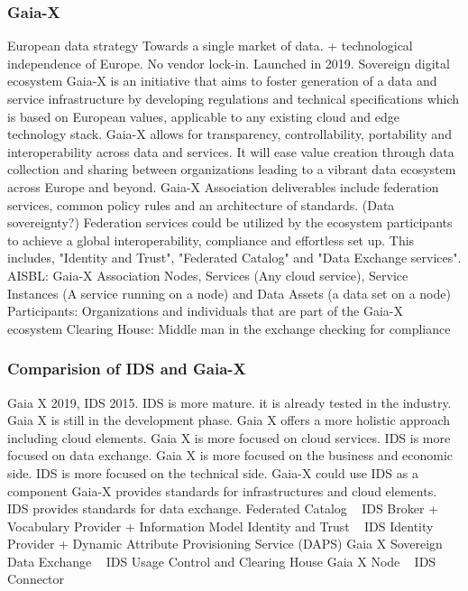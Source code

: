 \documentclass{article}
\begin{document}
\subsubsection*{Gaia-X}
European data strategy Towards a single market of data. + technological independence of Europe. No vendor lock-in. Launched in 2019. Sovereign digital ecosystem
Gaia-X is an initiative that aims to foster generation of a data and service infrastructure by developing regulations and technical specifications which is based on European values, applicable to any existing cloud and edge technology stack. Gaia-X allows for transparency, controllability, portability and interoperability across data and services. It will ease value creation through data collection and sharing between organizations leading to a vibrant data ecosystem across Europe and beyond. Gaia-X Association deliverables include federation services, common policy rules and an architecture of standards. (Data sovereignty?) Federation services could be utilized by the ecosystem participants to achieve a global interoperability, compliance and effortless set up. This includes, "Identity and Trust", "Federated Catalog" and "Data Exchange services". \cite{otto_role_2022}
AISBL: Gaia-X Association
Nodes, Services (Any cloud service), Service Instances (A service running on a node) and Data Assets (a data set on a node)
Participants: Organizations and individuals that are part of the Gaia-X ecosystem
Clearing House: Middle man in the exchange checking for compliance

\subsubsection*{Comparision of IDS and Gaia-X}
Gaia X 2019, IDS 2015. IDS is more mature. it is already tested in the industry. Gaia X is still in the development phase.
Gaia X offers a more holistic approach including cloud elements.
Gaia X is more focused on cloud services. IDS is more focused on data exchange.
Gaia X is more focused on the business and economic side. IDS is more focused on the technical side.
Gaia-X could use IDS as a component \cite{otto_role_2022}
Gaia-X provides standards for infrastructures and cloud elements. IDS provides standards for data exchange.
Federated Catalog ~ IDS Broker + Vocabulary Provider + Information Model
Identity and Trust ~ IDS Identity Provider + Dynamic Attribute Provisioning Service (DAPS)
Gaia X Sovereign Data Exchange ~ IDS Usage Control and Clearing House
Gaia X Node ~ IDS Connector
\end{document}
